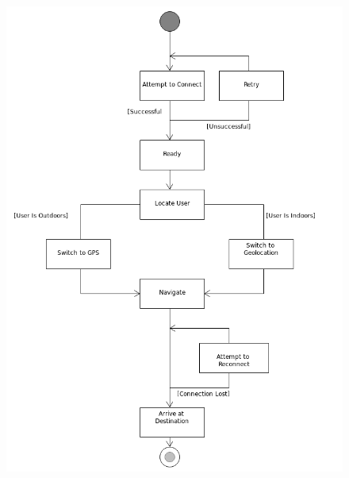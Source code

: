 \documentclass{article}
\begin{document}
	\begin{figure}[h]
  		\includegraphics[width=\textwidth]{Images/NavigationState.png}
	\end{figure}
	
\end{document}
